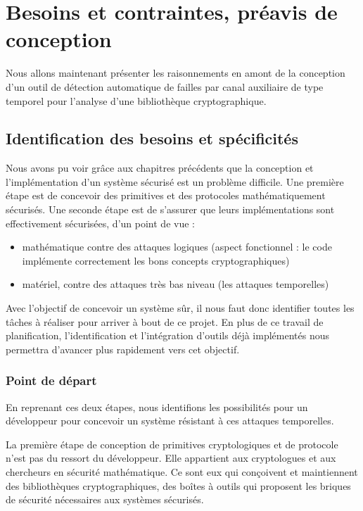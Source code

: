 \chapter{Besoins et contraintes, préavis de conception}
\label{chap:erysichtonConception}


Nous allons maintenant présenter les raisonnements en amont de la conception d'un outil de détection automatique de failles par canal auxiliaire de type temporel pour l'analyse d'une bibliothèque cryptographique.

\section{Identification des besoins et spécificités}

Nous avons pu voir grâce aux chapitres précédents que la conception et l'implémentation d'un système sécurisé est un problème difficile. Une première étape est de concevoir des primitives et des protocoles mathématiquement sécurisés. Une seconde étape est de s’assurer que leurs implémentations sont effectivement sécurisées, d'un point de vue : 

\begin{itemize}
    \item mathématique contre des attaques logiques (aspect fonctionnel : le code implémente correctement les bons concepts cryptographiques)
    \item matériel, contre des attaques très bas niveau (les attaques temporelles)
\end{itemize}

Avec l'objectif de concevoir un système sûr, il nous faut donc identifier toutes les tâches à réaliser pour arriver à bout de ce projet. En plus de ce travail de planification, l'identification et l'intégration d'outils déjà implémentés nous permettra d'avancer plus rapidement vers cet objectif.\smallbreak


\subsection*{Point de départ}

En reprenant ces deux étapes, nous identifions les possibilités pour un développeur pour concevoir un système résistant à ces attaques temporelles.\smallbreak

La première étape de conception de primitives cryptologiques et de protocole n'est pas du ressort du développeur. Elle appartient aux cryptologues et aux chercheurs en sécurité mathématique. Ce sont eux qui conçoivent et maintiennent des bibliothèques cryptographiques, des boîtes à outils qui proposent les briques de sécurité nécessaires aux systèmes sécurisés.\medbreak

